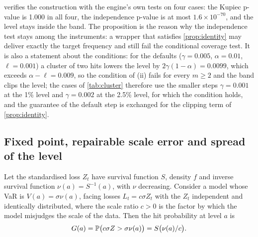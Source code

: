  verifies the construction with the engine's own tests on four cases: the Kupiec p-value is 1.000 in all four, the independence p-value is at most $1.6\times 10^{-70}$, and the level stays inside the band. The proposition is the reason why the independence test stays among the instruments: a wrapper that satisfies \cref{prop:identity} may deliver exactly the target frequency and still fail the conditional coverage test. It is also a statement about the conditions: for the defaults ($\gamma = 0.005$, $\alpha = 0.01$, $\ell = 0.001$) a cluster of two hits lowers the level by $2\gamma(1-\alpha) = 0.0099$, which exceeds $\alpha - \ell = 0.009$, so the condition of (ii) fails for every $m \ge 2$ and the band clips the level; the cases of \cref{tab:cluster} therefore use the smaller steps $\gamma = 0.001$ at the 1\% level and $\gamma = 0.002$ at the 2.5\% level, for which the condition holds, and the guarantee of the default step is exchanged for the clipping term of \cref{prop:identity}.



\subsection{Fixed point, repairable scale error and spread of the level}
\label{sec:theory-fixed-point}

Let the standardised loss $Z_t$ have survival function $S$, density $f$ and inverse survival function $\nu(a) = S^{-1}(a)$, with $\nu$ decreasing. Consider a model whose VaR is $V(a) = \sigma\nu(a)$, facing losses $L_t = c\sigma Z_t$ with the $Z_t$ independent and identically distributed, where the scale ratio $c > 0$ is the factor by which the model misjudges the scale of the data. Then the hit probability at level $a$ is
\begin{equation}
G(a) = \mathbb{P}\bigl(c\sigma Z > \sigma\nu(a)\bigr) = S\bigl(\nu(a)/c\bigr).
\label{eq:hit-prob}
\end{equation}

